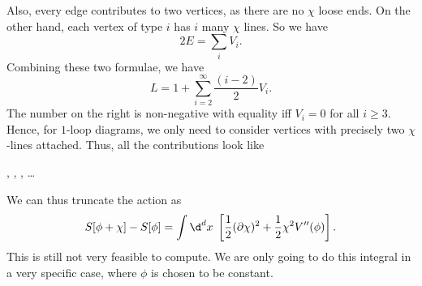 \documentclass[a4paper]{article}
\begin{document}
Also, every edge contributes to two vertices, as there are no $\chi$ loose ends. On the other hand, each vertex of type $i$ has $i$ many $\chi$ lines. So we have
\[
  2E = \sum_i V_i.
\]
Combining these two formulae, we have
\[
  L = 1 + \sum_{i = 2}^\infty \frac{(i - 2)}{2} V_i.
\]
The number on the right is non-negative with equality iff $V_i = 0$ for all $i \geq 3$. Hence, for $1$-loop diagrams, we only need to consider vertices with precisely two $\chi$-lines attached. Thus, all the contributions look like
\begin{center}
  ,\quad
  ,\quad
  ,\quad
  \ldots
\end{center}
We can thus truncate the action as
\[
  S[\phi + \chi] - S[\phi] = \int \d^d x\;\left[ \frac{1}{2} (\partial \chi)^2 + \frac{1}{2} \chi^2 V''(\phi)\right].
\]
This is still not very feasible to compute. We are only going to do this integral in a very specific case, where $\phi$ is chosen to be constant.
\end{document}
